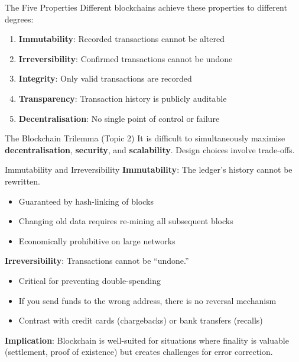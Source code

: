 \documentclass[10pt]{beamer}
\newcommand{\highlight}[1]{\textcolor{AccentOrange}{\textbf{#1}}}
\begin{document}
\begin{frame}{The Five Properties}
  Different blockchains achieve these properties to different degrees:
  
  \vspace{1em}
  \begin{enumerate}
    \item \textbf{Immutability}: Recorded transactions cannot be altered
    
    \item \textbf{Irreversibility}: Confirmed transactions cannot be undone
    
    \item \textbf{Integrity}: Only valid transactions are recorded
    
    \item \textbf{Transparency}: Transaction history is publicly auditable
    
    \item \textbf{Decentralisation}: No single point of control or failure
  \end{enumerate}
  
  \vspace{1em}
  \begin{block}{The Blockchain Trilemma (Topic 2)}
    It is difficult to simultaneously maximise \highlight{decentralisation}, \highlight{security}, and \highlight{scalability}. Design choices involve trade-offs.
  \end{block}
\end{frame}

\begin{frame}{Immutability and Irreversibility}
  \textbf{Immutability}: The ledger's history cannot be rewritten.
  
  \begin{itemize}
    \item Guaranteed by hash-linking of blocks
    \item Changing old data requires re-mining all subsequent blocks
    \item Economically prohibitive on large networks
  \end{itemize}
  
  \vspace{1em}
  \textbf{Irreversibility}: Transactions cannot be ``undone.''
  
  \begin{itemize}
    \item Critical for preventing double-spending
    \item If you send funds to the wrong address, there is no reversal mechanism
    \item Contrast with credit cards (chargebacks) or bank transfers (recalls)
  \end{itemize}
  
  \vspace{1em}
  \textbf{Implication}: Blockchain is well-suited for situations where finality is valuable (settlement, proof of existence) but creates challenges for error correction.
\end{frame}
\end{document}
